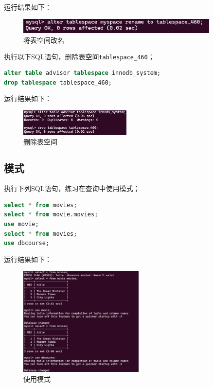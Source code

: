 \documentclass{article}
\renewcommand\tt{\texttt}
\begin{document}
运行结果如下：

\begin{figure}[H]
\centering
\includegraphics[width=0.9\textwidth]{img/6.png}
\caption{将表空间改名}
\end{figure}

执行以下SQL语句，删除表空间\tt{tablespace\_460}；

\begin{lstlisting}[language=sql]
alter table advisor tablespace innodb_system;
drop tablespace tablespace_460;
\end{lstlisting}

运行结果如下：

\begin{figure}[H]
\centering
\includegraphics[width=0.5\textwidth]{img/7.png}
\caption{删除表空间}
\end{figure}

\subsection{模式}

执行下列SQL语句，练习在查询中使用模式；

\begin{lstlisting}[language=sql]
select * from movies;
select * from movie.movies;
use movie;
select * from movies;
use dbcourse;
\end{lstlisting}

运行结果如下：

\begin{figure}[H]
\centering
\includegraphics[width=0.56\textwidth]{img/8.png}
\caption{使用模式}
\end{figure}
\end{document}
